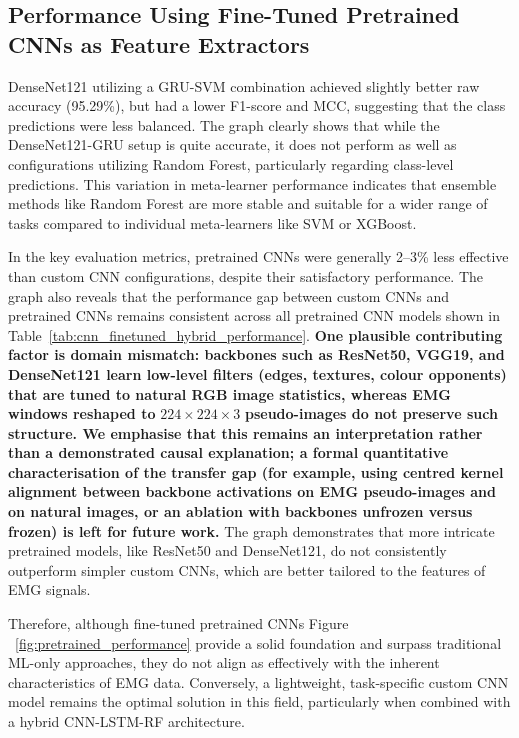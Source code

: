 \documentclass{elektr}
\newcommand{\yh}[1]{{\color{revhi}\textbf{#1}}}
\begin{document}
\subsection{Performance Using Fine-Tuned Pretrained CNNs as Feature Extractors}

DenseNet121 utilizing a GRU-SVM combination achieved slightly better raw accuracy (95.29\%), but had a lower F1-score and MCC, suggesting that the class predictions were less balanced. The graph clearly shows that while the DenseNet121-GRU setup is quite accurate, it does not perform as well as configurations utilizing Random Forest, particularly regarding class-level predictions. This variation in meta-learner performance indicates that ensemble methods like Random Forest are more stable and suitable for a wider range of tasks compared to individual meta-learners like SVM or XGBoost.

In the key evaluation metrics, pretrained CNNs were generally 2–3\% less effective than custom CNN configurations, despite their satisfactory performance. The graph also reveals that the performance gap between custom CNNs and pretrained CNNs remains consistent across all pretrained CNN models shown in Table~\ref{tab:cnn_finetuned_hybrid_performance}. \yh{One plausible contributing factor is domain mismatch: backbones such as ResNet50, VGG19, and DenseNet121 learn low-level filters (edges, textures, colour opponents) that are tuned to natural RGB image statistics, whereas EMG windows reshaped to }$224\times224\times3$\yh{ pseudo-images do not preserve such structure. We emphasise that this remains an interpretation rather than a demonstrated causal explanation; a formal quantitative characterisation of the transfer gap (for example, using centred kernel alignment between backbone activations on EMG pseudo-images and on natural images, or an ablation with backbones unfrozen versus frozen) is left for future work.} The graph demonstrates that more intricate pretrained models, like ResNet50 and DenseNet121, do not consistently outperform simpler custom CNNs, which are better tailored to the features of EMG signals.

Therefore, although fine-tuned pretrained CNNs Figure ~\ref{fig:pretrained_performance} provide a solid foundation and surpass traditional ML-only approaches, they do not align as effectively with the inherent characteristics of EMG data. Conversely, a lightweight, task-specific custom CNN model remains the optimal solution in this field, particularly when combined with a hybrid CNN-LSTM-RF architecture.
\end{document}
